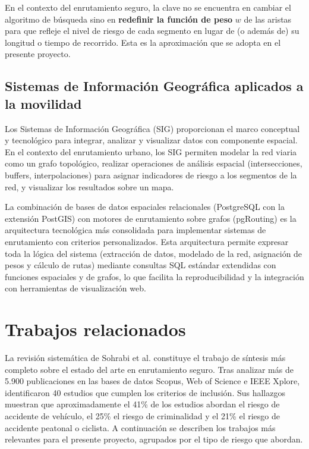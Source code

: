 En el contexto del enrutamiento seguro, la clave no se encuentra en cambiar el algoritmo de búsqueda sino en \textbf{redefinir la función de peso} $w$ de las aristas para que refleje el nivel de riesgo de cada segmento en lugar de (o además de) su longitud o tiempo de recorrido. Esta es la aproximación que se adopta en el presente proyecto.

\subsection{Sistemas de Información Geográfica aplicados a la movilidad}
\label{subsec:sig_movilidad}

Los Sistemas de Información Geográfica (SIG) proporcionan el marco conceptual y tecnológico para integrar, analizar y visualizar datos con componente espacial. En el contexto del enrutamiento urbano, los SIG permiten modelar la red viaria como un grafo topológico, realizar operaciones de análisis espacial (intersecciones, buffers, interpolaciones) para asignar indicadores de riesgo a los segmentos de la red, y visualizar los resultados sobre un mapa.

La combinación de bases de datos espaciales relacionales (PostgreSQL con la extensión PostGIS) con motores de enrutamiento sobre grafos (pgRouting) es la arquitectura tecnológica más consolidada para implementar sistemas de enrutamiento con criterios personalizados. Esta arquitectura permite expresar toda la lógica del sistema (extracción de datos, modelado de la red, asignación de pesos y cálculo de rutas) mediante consultas SQL estándar extendidas con funciones espaciales y de grafos, lo que facilita la reproducibilidad y la integración con herramientas de visualización web.

\section{Trabajos relacionados}
\label{sec:trabajos_relacionados}

La revisión sistemática de Sohrabi et al. \cite{sohrabi2022} constituye el trabajo de síntesis más completo sobre el estado del arte en enrutamiento seguro. Tras analizar más de 5.900 publicaciones en las bases de datos Scopus, Web of Science e IEEE Xplore, identificaron 40 estudios que cumplen los criterios de inclusión. Sus hallazgos muestran que aproximadamente el 41\% de los estudios abordan el riesgo de accidente de vehículo, el 25\% el riesgo de criminalidad y el 21\% el riesgo de accidente peatonal o ciclista. A continuación se describen los trabajos más relevantes para el presente proyecto, agrupados por el tipo de riesgo que abordan.

